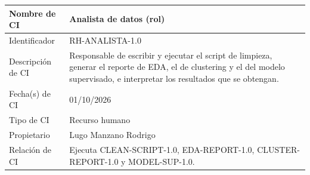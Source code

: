 \documentclass[letterpaper,11pt]{article}
\begin{document}
\noindent\begin{minipage}{\textwidth}
\small\renewcommand{\arraystretch}{1.9}
\begin{tabularx}{\textwidth}{|p{3.3cm}|Y|}
\hline
Nombre de CI & Analista de datos (rol) \\ \hline
Identificador & RH-ANALISTA-1.0 \\ \hline
Descripción de CI & Responsable de escribir y ejecutar el script de limpieza, generar el reporte de EDA, el de clustering y el del modelo supervisado, e interpretar los resultados que se obtengan. \\ \hline
Fecha(s) de CI & 01/10/2026 \\ \hline
Tipo de CI & Recurso humano \\ \hline
Propietario & Lugo Manzano Rodrigo \\ \hline
Relación de CI & Ejecuta CLEAN-SCRIPT-1.0, EDA-REPORT-1.0, CLUSTER-REPORT-1.0 y MODEL-SUP-1.0. \\ \hline
\end{tabularx}
\end{minipage}\par\bigskip

\clearpage
{}
\begingroup
\makeatletter
\let\ps@plain\ps@referencias
\makeatother
\pagestyle{referencias}
\nocite{*}
\printbibliography[heading=none]
\endgroup
\end{document}

